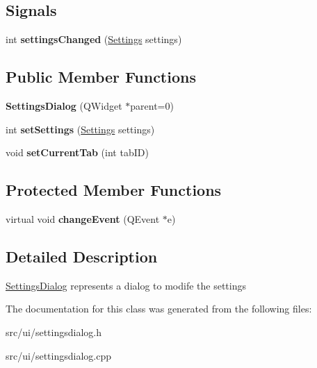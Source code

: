 \subsection*{Signals}
\begin{CompactItemize}
\item 
\hypertarget{classSettingsDialog_0d3bc2e27e785778a3fe380efa19ec27}{
int \textbf{settingsChanged} (\hyperlink{classSettings}{Settings} settings)}
\label{classSettingsDialog_0d3bc2e27e785778a3fe380efa19ec27}

\end{CompactItemize}
\subsection*{Public Member Functions}
\begin{CompactItemize}
\item 
\hypertarget{classSettingsDialog_9933956b777b2c0451e9119581cc22fb}{
\textbf{SettingsDialog} (QWidget $\ast$parent=0)}
\label{classSettingsDialog_9933956b777b2c0451e9119581cc22fb}

\item 
\hypertarget{classSettingsDialog_47a0830779bc31c1ddaa5a0a782ad6b8}{
int \textbf{setSettings} (\hyperlink{classSettings}{Settings} settings)}
\label{classSettingsDialog_47a0830779bc31c1ddaa5a0a782ad6b8}

\item 
\hypertarget{classSettingsDialog_ca93115432ec0c943ea0fad51edd9b29}{
void \textbf{setCurrentTab} (int tabID)}
\label{classSettingsDialog_ca93115432ec0c943ea0fad51edd9b29}

\end{CompactItemize}
\subsection*{Protected Member Functions}
\begin{CompactItemize}
\item 
\hypertarget{classSettingsDialog_0d0670544a7d571840aa54fb4b74aed7}{
virtual void \textbf{changeEvent} (QEvent $\ast$e)}
\label{classSettingsDialog_0d0670544a7d571840aa54fb4b74aed7}

\end{CompactItemize}


\subsection{Detailed Description}
\hyperlink{classSettingsDialog}{SettingsDialog} represents a dialog to modife the settings 

The documentation for this class was generated from the following files:\begin{CompactItemize}
\item 
src/ui/settingsdialog.h\item 
src/ui/settingsdialog.cpp\end{CompactItemize}
